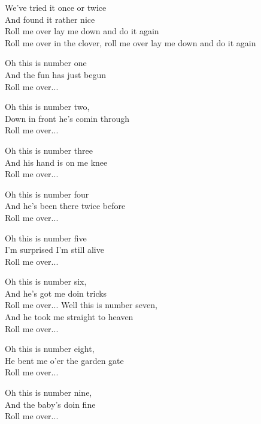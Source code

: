 \vspace{10pt}
We've tried it once or twice\\
And found it rather nice\\
Roll me over lay me down and do it again\\
Roll me over in the clover, roll me over lay me down and do it again\par
\vspace{10pt}
Oh this is number one \\
And the fun has just begun\\
Roll me over...\par
\vspace{10pt}
Oh this is number two,\\
Down in front he's comin through\\
Roll me over...\par
\vspace{10pt}
Oh this is number three\\
And his hand is on me knee\\
Roll me over...\par
\vspace{10pt}
Oh this is number four\\
And he's been there twice before\\
Roll me over...\par
\vspace{10pt}
Oh this is number five\\
I'm surprised I'm still alive\\
Roll me over...\par
\vspace{10pt}
Oh this is number six,\\
And he's got me doin tricks\\
Roll me over...
\newpage
Well this is number seven,\\
And he took me straight to heaven\\
Roll me over...\par
\vspace{7pt}
Oh this is number eight,\\
He bent me o'er the garden gate\\
Roll me over...\par
\vspace{7pt}
Oh this is number nine,\\
And the baby's doin fine\\
Roll me over...\par

